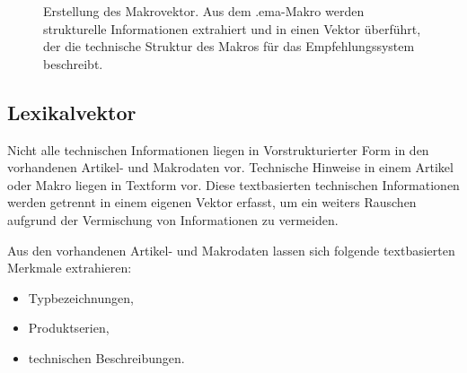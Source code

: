 \begin{figure}[H]
        \caption{Erstellung des Makrovektor. Aus dem .ema-Makro werden strukturelle Informationen extrahiert und in einen Vektor überführt, der die technische Struktur des Makros für das Empfehlungssystem beschreibt.} 
        \label{fig:makrovektor} 
        \end{figure}

\subsection{Lexikalvektor} 

Nicht alle technischen Informationen liegen in Vorstrukturierter Form in den vorhandenen Artikel- und Makrodaten vor. Technische Hinweise in einem Artikel oder Makro liegen in Textform vor. 
Diese textbasierten technischen Informationen werden getrennt in einem eigenen Vektor erfasst, um ein weiters Rauschen aufgrund der Vermischung von Informationen zu vermeiden.

Aus den vorhandenen Artikel- und Makrodaten lassen sich folgende textbasierten Merkmale extrahieren: 

\begin{itemize} 
    \item Typbezeichnungen, 
    \item Produktserien, 
    \item technischen Beschreibungen. 
\end{itemize} 

